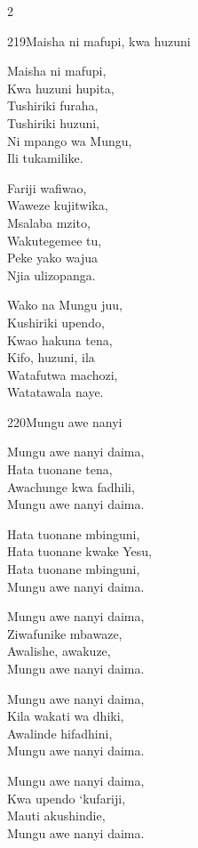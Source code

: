 \begin{multicols}{2}
\begin{hymn}{219}{Maisha ni mafupi, kwa huzuni}{}
\begin{stanza}
Maisha ni mafupi,\\
Kwa huzuni hupita,\\
Tushiriki furaha,\\
Tushiriki huzuni,\\
Ni mpango wa Mungu,\\
Ili tukamilike.
\end{stanza}
\begin{stanza}
Fariji wafiwao,\\
Waweze kujitwika,\\
Msalaba mzito,\\
Wakutegemee tu,\\
Peke yako wajua\\
Njia ulizopanga.
\end{stanza}
\begin{stanza}
Wako na Mungu juu,\\
Kushiriki upendo,\\
Kwao hakuna tena,\\
Kifo, huzuni, ila\\
Watafutwa machozi,\\
Watatawala naye.
\end{stanza}
\end{hymn}

\begin{hymn}{220}{Mungu awe nanyi}{}
\begin{stanza}
Mungu awe nanyi daima,\\
Hata tuonane tena,\\
Awachunge kwa fadhili,\\
Mungu awe nanyi daima.
\end{stanza}
\begin{chorus}
Hata tuonane mbinguni,\\
Hata tuonane kwake Yesu,\\
Hata tuonane mbinguni,\\
Mungu awe nanyi daima.
\end{chorus}
\begin{stanza}
Mungu awe nanyi daima,\\
Ziwafunike mbawaze,\\
Awalishe, awakuze,\\
Mungu awe nanyi daima.
\end{stanza}
\begin{stanza}
Mungu awe nanyi daima,\\
Kila wakati wa dhiki,\\
Awalinde hifadhini,\\
Mungu awe nanyi daima.
\end{stanza}
\begin{stanza}
Mungu awe nanyi daima,\\
Kwa upendo `kufariji,\\
Mauti akushindie,\\
Mungu awe nanyi daima.
\end{stanza}
\end{hymn}


\end{multicols}

